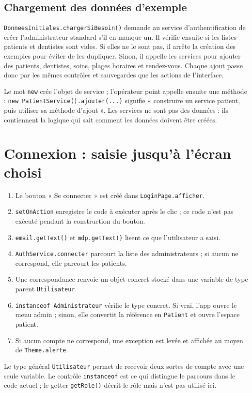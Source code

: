\documentclass[11pt,a4paper]{report}
\begin{document}
\subsection{Chargement des données d'exemple}
\texttt{DonneesInitiales.chargerSiBesoin()} demande au service d'authentification de créer l'administrateur standard s'il en manque un. Il vérifie ensuite si les listes patients et dentistes sont vides. Si elles ne le sont pas, il arrête la création des exemples pour éviter de les dupliquer. Sinon, il appelle les services pour ajouter des patients, dentistes, soins, plages horaires et rendez-vous. Chaque ajout passe donc par les mêmes contrôles et sauvegardes que les actions de l'interface.

Le mot \texttt{new} crée l'objet de service ; l'opérateur point appelle ensuite une méthode : \texttt{new PatientService().ajouter(...)} signifie « construire un service patient, puis utiliser sa méthode d'ajout ». Les services ne sont pas des données : ils contiennent la logique qui sait comment les données doivent être créées.

\section{Connexion : saisie jusqu'à l'écran choisi}
\begin{enumerate}
\item Le bouton « Se connecter » est créé dans \texttt{LoginPage.afficher}.
\item \texttt{setOnAction} enregistre le code à exécuter après le clic ; ce code n'est pas exécuté pendant la construction du bouton.
\item \texttt{email.getText()} et \texttt{mdp.getText()} lisent ce que l'utilisateur a saisi.
\item \texttt{AuthService.connecter} parcourt la liste des administrateurs ; si aucun ne correspond, elle parcourt les patients.
\item Une correspondance renvoie un objet concret stocké dans une variable de type parent \texttt{Utilisateur}.
\item \texttt{instanceof Administrateur} vérifie le type concret. Si vrai, l'app ouvre le menu admin ; sinon, elle convertit la référence en \texttt{Patient} et ouvre l'espace patient.
\item Si aucun compte ne correspond, une exception est levée et affichée au moyen de \texttt{Theme.alerte}.
\end{enumerate}
Le type général \texttt{Utilisateur} permet de recevoir deux sortes de compte avec une seule variable. Le contrôle \texttt{instanceof} est ce qui distingue le parcours dans le code actuel ; le getter \texttt{getRole()} décrit le rôle mais n'est pas utilisé ici.
\end{document}
